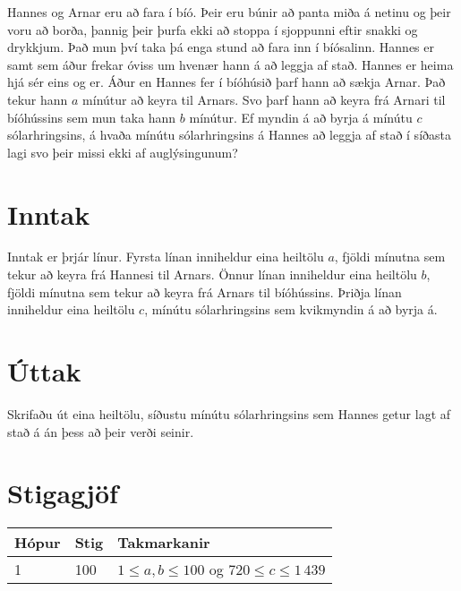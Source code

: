 
Hannes og Arnar eru að fara í bíó.
Þeir eru búnir að panta miða á netinu og þeir voru að borða, þannig þeir þurfa ekki að stoppa í sjoppunni eftir snakki og drykkjum.
Það mun því taka þá enga stund að fara inn í bíósalinn.
Hannes er samt sem áður frekar óviss um hvenær hann á að leggja af stað.
Hannes er heima hjá sér eins og er.
Áður en Hannes fer í bíóhúsið þarf hann að sækja Arnar.
Það tekur hann $a$ mínútur að keyra til Arnars.
Svo þarf hann að keyra frá Arnari til bíóhússins sem mun taka hann $b$ mínútur.
Ef myndin á að byrja á mínútu $c$ sólarhringsins, á hvaða mínútu sólarhringsins á Hannes að leggja af stað í síðasta lagi svo þeir missi ekki af auglýsingunum?

\section*{Inntak}
Inntak er þrjár línur.
Fyrsta línan inniheldur eina heiltölu $a$, fjöldi mínutna sem tekur að keyra frá Hannesi til Arnars.
Önnur línan inniheldur eina heiltölu $b$, fjöldi mínutna sem tekur að keyra frá Arnars til bíóhússins.
Þriðja línan inniheldur eina heiltölu $c$, mínútu sólarhringsins sem kvikmyndin á að byrja á.

\section*{Úttak}
Skrifaðu út eina heiltölu, síðustu mínútu sólarhringsins sem Hannes getur lagt af stað á án þess að þeir verði seinir.

\section*{Stigagjöf}
\begin{tabular}{|l|l|l|}
\hline
Hópur & Stig & Takmarkanir \\ \hline
1     & 100   & $1 \leq a, b \leq 100$ og $720 \leq c \leq 1\,439$  \\ \hline
\end{tabular}

